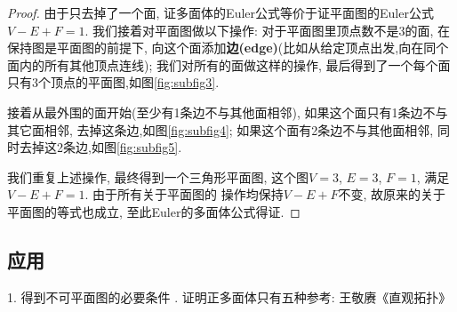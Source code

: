 \documentclass[main]{subfiles}
\begin{document}
\begin{proof}
由于只去掉了一个面, 证多面体的Euler公式等价于证平面图的Euler公式\(V-E+F=1\).
我们接着对平面图做以下操作: 对于平面图里顶点数不是3的面, 在保持图是平面图的前提下, 
向这个面添加\textbf{边(edge)}(比如从给定顶点出发,向在同个面内的所有其他顶点连线); 我们对所有的面做这样的操作, 最后得到了一个每个面只有3个顶点的平面图,如图\ref{fig:subfig3}.

接着从最外围的面开始(至少有1条边不与其他面相邻), 如果这个面只有1条边不与其它面相邻, 去掉这条边,如图\ref{fig:subfig4}; 如果这个面有2条边不与其他面相邻, 同时去掉这2条边,如图\ref{fig:subfig5}.

我们重复上述操作, 最终得到一个三角形平面图, 这个图$V=3$, $E=3$, $F=1$, 满足$V-E+F=1$. 由于所有关于平面图的
操作均保持$V-E+F$不变, 故原来的关于平面图的等式也成立, 至此Euler的多面体公式得证.
\end{proof}

\subsection*{应用}
1. 得到不可平面图的必要条件 . 证明正多面体只有五种\quad 参考: 王敬赓《直观拓扑》
\end{document}
